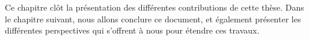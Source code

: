 Ce chapitre clôt la présentation des différentes contributions de cette thèse.
Dans le chapitre suivant, nous allons conclure ce document, et également présenter les différentes perspectives qui s'offrent à nous pour étendre ces travaux.

